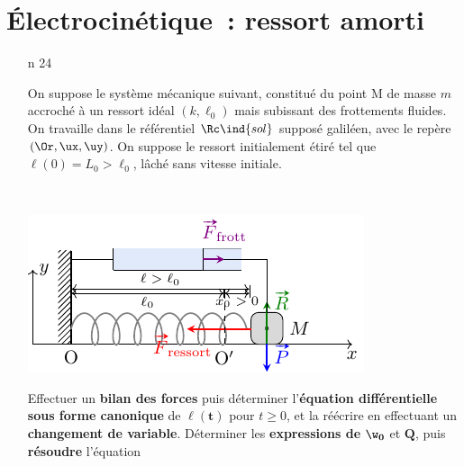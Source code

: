 \documentclass[a4paper, 10pt, final, garamond]{book}
\begin{document}
\setcounter{chapter}{5}


\chapter{Électrocinétique~: ressort amorti}

\vspace{-15pt}
\begin{enumerate}[label=\sqenumi, leftmargin=10pt]
	\item[n]{24}
	      \noindent
	      \begin{minipage}[t]{.65\linewidth}
		      On suppose le système mécanique suivant, constitué du point M de masse
		      $m$ accroché à un ressort idéal $(k,\ell_0)$ mais subissant des
		      frottements fluides. On travaille dans le référentiel $\Rc\ind{sol}$
		      supposé galiléen, avec le repère $(\Or, \ux, \uy)$. On suppose le
		      ressort initialement étiré tel que $\ell(0) = L_0 > \ell_0$, lâché
		      sans vitesse initiale.
	      \end{minipage}
	      \hfill
	      \begin{minipage}[t]{.32\linewidth}
		      ~
		      \vspace{-40pt}
		      \begin{center}
			      \includegraphics[width=\linewidth]{ressort_amorti}
		      \end{center}
	      \end{minipage}
	      Effectuer un \textbf{bilan des forces} puis déterminer
	      l'\textbf{équation différentielle sous forme canonique} de
	      $\mathbf{\ell(t)}$ pour $t \geq 0$, et la réécrire en effectuant un
	      \textbf{changement de variable}. Déterminer les \textbf{expressions de}
	      $\mathbf{\w_0}$ et $\mathbf{Q}$, puis \textbf{résoudre} l'équation

\end{enumerate}
\end{document}
